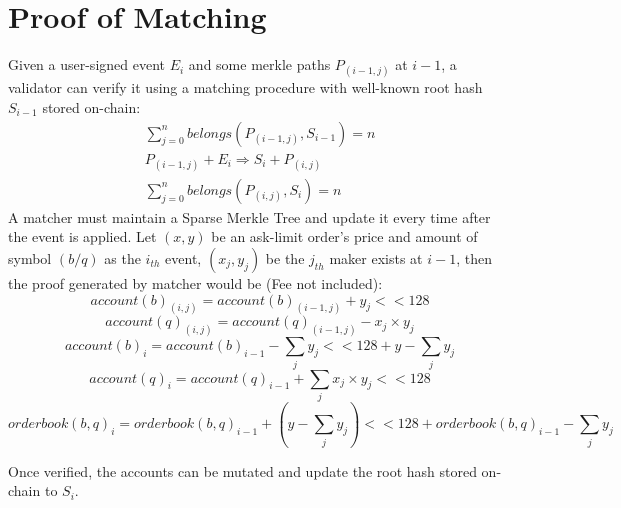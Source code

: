 \documentclass[a4paper,12pt]{article}
\begin{document}
\section{Proof of Matching}
\label{sec:org48d64ef}
Given a user-signed event \(E_{i}\) and some merkle paths \(P_{(i-1, j)}\) at \(i-1\), a validator can verify it using a matching procedure with well-known root hash \(S_{i-1}\) stored on-chain:\\
\begin{eqnarray*}
\sum\limits_{j=0}^{n} belongs(P_{(i-1, j)}, S_{i-1}) = n\\
P_{(i-1, j)} + E_{i} \Rightarrow S_{i} + P_{(i, j)} \\
\sum\limits_{j=0}^{n} belongs(P_{(i, j)}, S_{i}) = n
\end{eqnarray*}
A matcher must maintain a Sparse Merkle Tree and update it every time after the event is applied. Let \((x, y)\) be an ask-limit order's price and amount of symbol \((b/q)\) as the \(i_{th}\) event, \((x_{j}, y_{j})\) be the \(j_{th}\) maker exists at \(i-1\), then the proof generated by matcher would be (Fee not included):\\
\begin{equation*}
    account(b)_{(i, j)}=account(b)_{(i-1,j)} + y_{j} << 128
\end{equation*}
\begin{equation*}
    account(q)_{(i, j)}=account(q)_{(i-1,j)} - x_{j} \times y_{j}
\end{equation*}
\begin{equation*}
    account(b)_{i}=account(b)_{i-1} - \sum\limits_{j} y_{j} << 128 + y - \sum\limits_{j} y_{j}
\end{equation*}
\begin{equation*}
    account(q)_{i}=account(q)_{i-1} + \sum\limits_{j} x_{j} \times y_{j} << 128
\end{equation*}
\begin{equation*}
    orderbook(b,q)_{i}=orderbook(b,q)_{i-1} + (y - \sum\limits_{j} y_{j}) << 128 + orderbook(b,q)_{i-1} - \sum\limits_{j} y_{j}
\end{equation*}

Once verified, the accounts can be mutated and update the root hash stored on-chain to \(S_{i}\).\\
\end{document}
